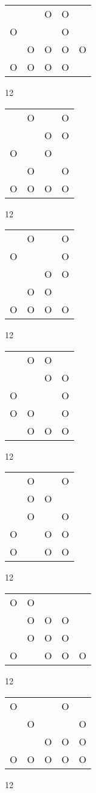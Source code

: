 \begin{tabular}{|m{0.2cm}m{0.2cm}m{0.2cm}m{0.2cm}m{0.2cm}|}\hline
 & &O&O& \\
O& & &O& \\
 &O&O&O&O\\
O&O&O&O& \\
\hline\end{tabular}12
\begin{tabular}{|m{0.2cm}m{0.2cm}m{0.2cm}m{0.2cm}|}\hline
 &O& &O\\
 & &O&O\\
O& &O& \\
 &O& &O\\
O&O&O&O\\
\hline\end{tabular}12
\begin{tabular}{|m{0.2cm}m{0.2cm}m{0.2cm}m{0.2cm}|}\hline
 &O& &O\\
O& & &O\\
 & &O&O\\
 &O&O& \\
O&O&O&O\\
\hline\end{tabular}12
\begin{tabular}{|m{0.2cm}m{0.2cm}m{0.2cm}m{0.2cm}|}\hline
 &O&O& \\
 & &O&O\\
O& & &O\\
O&O& &O\\
 &O&O&O\\
\hline\end{tabular}12
\begin{tabular}{|m{0.2cm}m{0.2cm}m{0.2cm}m{0.2cm}|}\hline
 &O& &O\\
 &O&O& \\
 &O& &O\\
O& &O&O\\
O& &O&O\\
\hline\end{tabular}12
\begin{tabular}{|m{0.2cm}m{0.2cm}m{0.2cm}m{0.2cm}m{0.2cm}|}\hline
O&O& & & \\
 &O&O&O& \\
 &O&O&O& \\
O& &O&O&O\\
\hline\end{tabular}12
\begin{tabular}{|m{0.2cm}m{0.2cm}m{0.2cm}m{0.2cm}m{0.2cm}|}\hline
O& & &O& \\
 &O& & &O\\
 & &O&O&O\\
O&O&O&O&O\\
\hline\end{tabular}12

